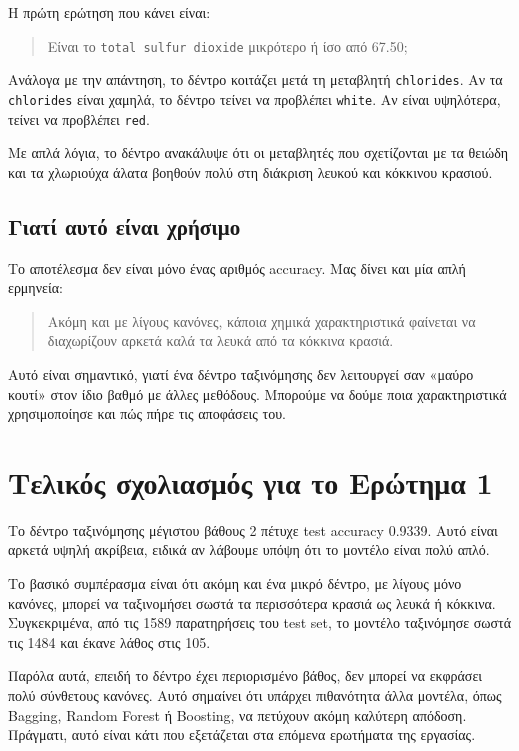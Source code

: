 \documentclass[12pt,a4paper]{article}
\newcommand{\code}[1]{\texttt{\textenglish{#1}}}
\begin{document}
Η πρώτη ερώτηση που κάνει είναι:

\begin{quote}
Είναι το \code{total sulfur dioxide} μικρότερο ή ίσο από 67.50;
\end{quote}

Ανάλογα με την απάντηση, το δέντρο κοιτάζει μετά τη μεταβλητή
\code{chlorides}. Αν τα \code{chlorides} είναι χαμηλά, το δέντρο τείνει να
προβλέπει \code{white}. Αν είναι υψηλότερα, τείνει να προβλέπει \code{red}.

Με απλά λόγια, το δέντρο ανακάλυψε ότι οι μεταβλητές που σχετίζονται με τα
θειώδη και τα χλωριούχα άλατα βοηθούν πολύ στη διάκριση λευκού και κόκκινου
κρασιού.

\subsection{Γιατί αυτό είναι χρήσιμο}

Το αποτέλεσμα δεν είναι μόνο ένας αριθμός accuracy. Μας δίνει και μία απλή
ερμηνεία:

\begin{quote}
Ακόμη και με λίγους κανόνες, κάποια χημικά χαρακτηριστικά φαίνεται να
διαχωρίζουν αρκετά καλά τα λευκά από τα κόκκινα κρασιά.
\end{quote}

Αυτό είναι σημαντικό, γιατί ένα δέντρο ταξινόμησης δεν λειτουργεί σαν
«μαύρο κουτί» στον ίδιο βαθμό με άλλες μεθόδους. Μπορούμε να δούμε ποια
χαρακτηριστικά χρησιμοποίησε και πώς πήρε τις αποφάσεις του.

\section{Τελικός σχολιασμός για το Ερώτημα 1}

Το δέντρο ταξινόμησης μέγιστου βάθους 2 πέτυχε test accuracy 0.9339. Αυτό
είναι αρκετά υψηλή ακρίβεια, ειδικά αν λάβουμε υπόψη ότι το μοντέλο είναι
πολύ απλό.

Το βασικό συμπέρασμα είναι ότι ακόμη και ένα μικρό δέντρο, με λίγους μόνο
κανόνες, μπορεί να ταξινομήσει σωστά τα περισσότερα κρασιά ως λευκά ή κόκκινα.
Συγκεκριμένα, από τις 1589 παρατηρήσεις του test set, το μοντέλο ταξινόμησε
σωστά τις 1484 και έκανε λάθος στις 105.

Παρόλα αυτά, επειδή το δέντρο έχει περιορισμένο βάθος, δεν μπορεί να εκφράσει
πολύ σύνθετους κανόνες. Αυτό σημαίνει ότι υπάρχει πιθανότητα άλλα μοντέλα,
όπως Bagging, Random Forest ή Boosting, να πετύχουν ακόμη καλύτερη απόδοση.
Πράγματι, αυτό είναι κάτι που εξετάζεται στα επόμενα ερωτήματα της εργασίας.
\end{document}
